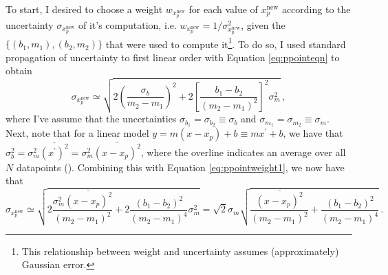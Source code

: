 To start, I desired to choose a weight $w_{x_p^\text{new}}$ for each value of $x_p^\text{new}$ according to the uncertainty $\sigma_{x_p^\text{new}}$ of it's computation, i.e. $w_{x_p^\text{new}}=1/\sigma_{x_p^\text{new}}^2$, given the $\{(b_1,m_1),(b_2,m_2)\}$ that were used to compute it\footnote{This relationship between weight and uncertainty assumes (approximately) Gaussian error.}. To do so, I used standard propagation of uncertainty to first linear order with Equation \eqref{eq:ppointeqn} to obtain
\begin{equation}
\label{eq:ppointweight1}
\sigma_{x_p^\text{new}} \simeq \sqrt{2\left(\frac{\sigma_b}{m_2-m_1}\right)^2 + 2\left[\frac{b_1-b_2}{(m_2-m_1)^2}\right]^2\sigma_m^2}\,,
\end{equation}
where I've assume that the uncertainties $\sigma_{b_1}=\sigma_{b_2}\equiv\sigma_b$ and $\sigma_{m_1}=\sigma_{m_2}\equiv\sigma_m$. Next, note that for a linear model $y=m(x-x_p)+b\equiv mx^\prime+b$, we have that $\sigma_b^2=\sigma_m^2\overline{(x^\prime)^2}=\sigma_m^2\overline{(x-x_p)^2}$, where the overline indicates an average over all $N$ datapoints (\textcite{morrison2014obtaining}). Combining this with Equation \eqref{eq:ppointweight1}, we now have that 
\begin{equation}
\label{eq:ppointweight2}
\sigma_{x_p^\text{new}} \simeq \sqrt{2\frac{\sigma_m^2\overline{(x-x_p)^2}}{(m_2-m_1)^2} + 2\frac{(b_1-b_2)^2}{(m_2-m_1)^4}\sigma_m^2}=\sqrt{2}\sigma_m\sqrt{\frac{\overline{(x-x_p)^2}}{(m_2-m_1)^2} + \frac{(b_1-b_2)^2}{(m_2-m_1)^4}}\,.
\end{equation}

